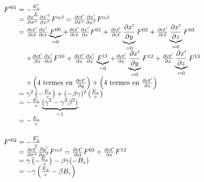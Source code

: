 {\renewcommand*{\arraystretch}{2}$$
	\begin{array}{r@{\;}l}
		F'^{01}=&-\frac{E'_x}{c}\\
			=&\frac{\partial x'^0}{\partial x^\alpha}\frac{\partial x'^1}{\partial x^\beta}F^{\alpha\beta}
			=\frac{\partial ct'}{\partial x^\alpha}\frac{\partial x'}{\partial x^\beta}F^{\alpha\beta}\\
			=&\frac{\partial ct'}{\partial ct}\frac{\partial x'}{\partial ct}\underbrace{F^{00}}_{=0}
				+\frac{\partial ct'}{\partial ct}\frac{\partial x'}{\partial x}F^{01}
				+\frac{\partial ct'}{\partial ct}\underbrace{\frac{\partial x'}{\partial y}}_{=0}F^{02}
				+\frac{\partial ct'}{\partial ct}\underbrace{\frac{\partial x'}{\partial z}}_{=0}F^{03}\\
			&+\frac{\partial ct'}{\partial x}\frac{\partial x'}{\partial ct}F^{10}
				+\frac{\partial ct'}{\partial x}\frac{\partial x'}{\partial x}\underbrace{F^{11}}_{=0}
				+\frac{\partial ct'}{\partial x}\underbrace{\frac{\partial x'}{\partial y}}_{=0}F^{12}
				+\frac{\partial ct'}{\partial x}\underbrace{\frac{\partial x'}{\partial z}}_{=0}F^{13}\\
			&+\left(\text{4 termes en }\frac{\partial ct'}{\partial y}\right)
				+\left(\text{4 termes en }\frac{\partial ct'}{\partial z}\right)\\
			=&\gamma^2\left( -\frac{E_x}{c} \right)+(-\beta\gamma)^2\left( \frac{E_x}{c} \right)\\
			=&-\frac{E_x}{c}\underbrace{(\gamma^2-\gamma^2\beta^2)}_{=1}\\
			=&-\frac{E_x}{c}\\[15pt]
		F'^{02}=&-\frac{E'_y}{c}\\
			=&\frac{\partial ct'}{\partial x^\alpha}\frac{\partial y'}{\partial x^\beta}F^{\alpha\beta}
			=\frac{\partial ct'}{\partial ct}F^{02}+\frac{\partial ct'}{\partial x}F^{12}\\
			=&\gamma\left(-\frac{E_x}{c}\right)-\beta\gamma(-B_z)\\
			=&-\gamma\left(\frac{E_y}{c}-\beta B_z\right)
	\end{array} 
$$}

